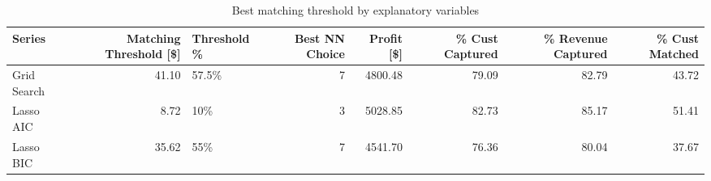 \begin{table}[ht]
\centering
\caption{Best matching threshold by explanatory variables} 
\label{tab:series_max}
\begin{tabular}{lrlrrrrr}
  \hline
Series & Matching Threshold [\$] & Threshold \% & Best NN Choice & Profit [\$] & \% Cust Captured & \% Revenue Captured & \% Cust Matched \\ 
  \hline
Grid Search & 41.10 & 57.5\% &   7 & 4800.48 & 79.09 & 82.79 & 43.72 \\ 
  Lasso AIC & 8.72 & 10\% &   3 & 5028.85 & 82.73 & 85.17 & 51.41 \\ 
  Lasso BIC & 35.62 & 55\% &   7 & 4541.70 & 76.36 & 80.04 & 37.67 \\ 
   \hline
\end{tabular}
\end{table}
